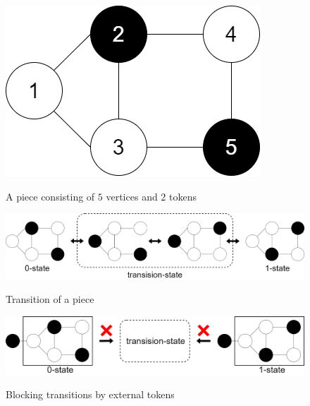 \documentclass[dvipdfmx,autodetect-engine]{jsarticle}
\begin{document}
\begin{figure}[b]
  \begin{center}
    \caption{A piece consisting of $5$ vertices and $2$ tokens}
    \includegraphics[scale=0.3]{part.png}
    \label{lednum}
  \end{center} 
\end{figure}


\begin{figure}[b]
  \begin{center}
    \caption{Transition of a piece}
    \includegraphics[scale=0.2]{transition.png}
    \label{lednum}
  \end{center} 
\end{figure}


\begin{figure}[b]
  \begin{center}
    \caption{Blocking transitions by external tokens}
    \includegraphics[scale=0.2]{blocking.png}
    \label{lednum}
  \end{center} 
\end{figure}
\end{document}
